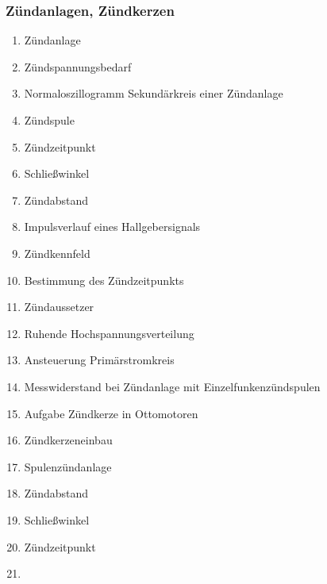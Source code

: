 \subsubsection{Zündanlagen,
Zündkerzen}\label{zuendanlagen-zuendkerzen}

\begin{enumerate}
\item
  Zündanlage\\
\item
  Zündspannungsbedarf\\
\item
  Normaloszillogramm Sekundärkreis einer Zündanlage\\
\item
  Zündspule\\
\item
  Zündzeitpunkt\\
\item
  Schließwinkel\\
\item
  Zündabstand\\
\item
  Impulsverlauf eines Hallgebersignals\\
\item
  Zündkennfeld\\
\item
  Bestimmung des Zündzeitpunkts\\
\item
  Zündaussetzer\\
\item
  Ruhende Hochspannungsverteilung\\
\item
  Ansteuerung Primärstromkreis\\
\item
  Messwiderstand bei Zündanlage mit Einzelfunkenzündspulen\\
\item
  Aufgabe Zündkerze in Ottomotoren\\
\item
  Zündkerzeneinbau\\
\item
  Spulenzündanlage\\
\item
  Zündabstand\\
\item
  Schließwinkel\\
\item
  Zündzeitpunkt\\
\item

\end{enumerate}
